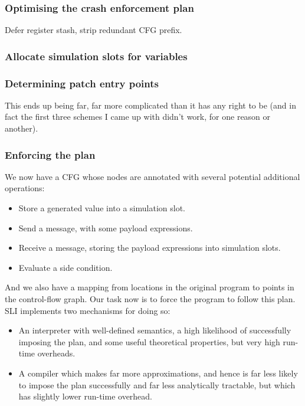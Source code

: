 \subsubsection{Optimising the crash enforcement plan}
Defer register stash, strip redundant CFG prefix.

\subsubsection{Allocate simulation slots for variables}

\subsubsection{Determining patch entry points}
This ends up being far, far more complicated than it has any right to
be (and in fact the first three schemes I came up with didn't work,
for one reason or another).

\subsubsection{Enforcing the plan}


We now have a CFG whose nodes are annotated with several potential additional operations:

\begin{itemize}
\item Store a generated value into a simulation slot.
\item Send a message, with some payload expressions.
\item Receive a message, storing the payload expressions into simulation slots.
\item Evaluate a side condition.
\end{itemize}

And we also have a mapping from locations in the original program to points in the control-flow graph.
Our task now is to force the program to follow this plan.
SLI implements two mechanisms for doing so:

\begin{itemize}
\item
  An interpreter with well-defined semantics, a high likelihood of successfully imposing the plan, and some useful theoretical properties, but very high run-time overheads.
\item
  A compiler which makes far more approximations, and hence is far less likely to impose the plan successfully and far less analytically tractable, but which has slightly lower run-time overhead.
\end{itemize}

